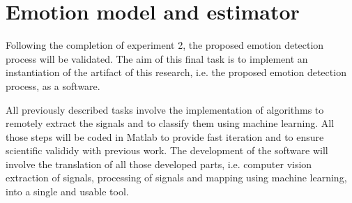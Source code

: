 \section{Emotion model and estimator}


Following the completion of experiment 2, the proposed emotion detection process will be validated. The aim of this final task is to implement an instantiation of the artifact of this research, i.e. the proposed emotion detection process, as a software.

All previously described tasks involve the implementation of algorithms to remotely extract the signals and to classify them using machine learning. All those steps will be coded in Matlab to provide fast iteration and to ensure scientific valididy with previous work. The development of the software will involve the translation of all those developed parts, i.e. computer vision extraction of signals, processing of signals and mapping using machine learning, into a single and usable tool.





